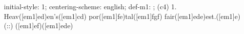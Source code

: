 initial-style: 1;
centering-scheme: english;
def-m1: \grealign;
(c4) 1. Heav([em1]ed)en's([em1]cd) por([em1]fe)tal([em1]fgf) fair([em1]ede)est.([em1]e) (::) ([em1]ef)([em1]ede)